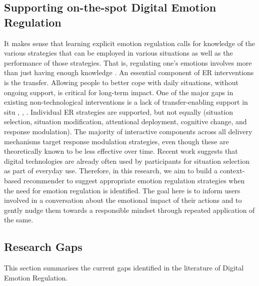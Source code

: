 \subsection{Supporting on-the-spot Digital Emotion Regulation}
It makes sense that learning explicit emotion regulation calls for knowledge of the various strategies that can be employed in various situations as well as the performance of those strategies. That is, regulating one's emotions involves more than just having enough knowledge \cite{slovak2022designing}. An essential component of ER interventions is the transfer. Allowing people to better cope with daily situations, without ongoing support, is critical for long-term impact. One of the major gaps in existing non-technological interventions is a lack of transfer-enabling support in situ \cite{slovak2016scaffolding}, \cite{antle2018opening}, \cite{antle2019design}. Individual ER strategies are supported, but not equally (situation selection, situation modification, attentional deployment, cognitive change, and response modulation). The majority of interactive components across all delivery mechanisms target response modulation strategies, even though these are theoretically known to be less effective over time. Recent work suggests that digital technologies are already often used by participants for situation selection as part of everyday use. Therefore, in this research, we aim to build a context-based recommender to suggest appropriate emotion regulation strategies when the need for emotion regulation is identified. The goal here is to inform users involved in a conversation about the emotional impact of their actions and to gently nudge them towards a responsible mindset through repeated application of the same.

\subsection{Research Gaps}
This section summarises the current gaps identified in the literature of Digital Emotion Regulation.

